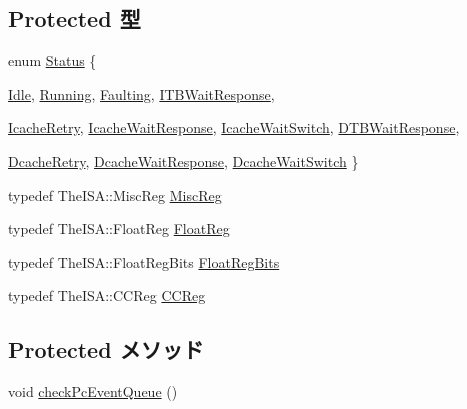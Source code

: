 \subsection*{Protected 型}
\begin{DoxyCompactItemize}
\item 
enum \hyperlink{classBaseSimpleCPU_a67a0db04d321a74b7e7fcfd3f1a3f70b}{Status} \{ \par
\hyperlink{classBaseSimpleCPU_a67a0db04d321a74b7e7fcfd3f1a3f70bad3fa9ae9431d6cb1772f9d9df48cab19}{Idle}, 
\hyperlink{classBaseSimpleCPU_a67a0db04d321a74b7e7fcfd3f1a3f70ba2f5f2c4a8c4f4f0519d503dcdfbf55cb}{Running}, 
\hyperlink{classBaseSimpleCPU_a67a0db04d321a74b7e7fcfd3f1a3f70bab5c34d467d56d4c58a5be9aa5dbb03e2}{Faulting}, 
\hyperlink{classBaseSimpleCPU_a67a0db04d321a74b7e7fcfd3f1a3f70ba0f2b789f7a775fa65b4d107b728cffeb}{ITBWaitResponse}, 
\par
\hyperlink{classBaseSimpleCPU_a67a0db04d321a74b7e7fcfd3f1a3f70baad09d918aed86399df0c327ea3418b15}{IcacheRetry}, 
\hyperlink{classBaseSimpleCPU_a67a0db04d321a74b7e7fcfd3f1a3f70baa694766f134e9cd81f5ad5b91dedf852}{IcacheWaitResponse}, 
\hyperlink{classBaseSimpleCPU_a67a0db04d321a74b7e7fcfd3f1a3f70bae892f6104e6e26b96d970b34619eb724}{IcacheWaitSwitch}, 
\hyperlink{classBaseSimpleCPU_a67a0db04d321a74b7e7fcfd3f1a3f70baa9c3fe4ed9cc00350965e1fc87f2353c}{DTBWaitResponse}, 
\par
\hyperlink{classBaseSimpleCPU_a67a0db04d321a74b7e7fcfd3f1a3f70ba0faf54129de01a1d6f0ba1c929e0fa40}{DcacheRetry}, 
\hyperlink{classBaseSimpleCPU_a67a0db04d321a74b7e7fcfd3f1a3f70ba62a98c3fd8f706eefc06ffbf0e657c7b}{DcacheWaitResponse}, 
\hyperlink{classBaseSimpleCPU_a67a0db04d321a74b7e7fcfd3f1a3f70ba45e19e93d67b542b4d8be7a5fc631aca}{DcacheWaitSwitch}
 \}
\item 
typedef TheISA::MiscReg \hyperlink{classBaseSimpleCPU_aaf5f073a387db0556d1db4bcc45428bc}{MiscReg}
\item 
typedef TheISA::FloatReg \hyperlink{classBaseSimpleCPU_a75484259f1855aabc8d74c6eb1cfe186}{FloatReg}
\item 
typedef TheISA::FloatRegBits \hyperlink{classBaseSimpleCPU_aab5eeae86499f9bfe15ef79360eccc64}{FloatRegBits}
\item 
typedef TheISA::CCReg \hyperlink{classBaseSimpleCPU_a0c9de550a32808e6a25b54b6c791d5ab}{CCReg}
\end{DoxyCompactItemize}
\subsection*{Protected メソッド}
\begin{DoxyCompactItemize}
\item 
void \hyperlink{classBaseSimpleCPU_a925a66fd31bbc43fa4bc4a90d5b316cb}{checkPcEventQueue} ()
\end{DoxyCompactItemize}
